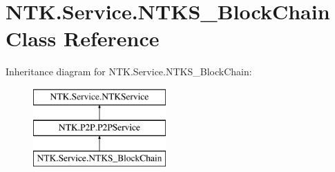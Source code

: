 \hypertarget{class_n_t_k_1_1_service_1_1_n_t_k_s___block_chain}{}\section{N\+T\+K.\+Service.\+N\+T\+K\+S\+\_\+\+Block\+Chain Class Reference}
\label{class_n_t_k_1_1_service_1_1_n_t_k_s___block_chain}


 


Inheritance diagram for N\+T\+K.\+Service.\+N\+T\+K\+S\+\_\+\+Block\+Chain\+:\begin{figure}[H]
\begin{center}
\leavevmode
\includegraphics[height=3.000000cm]{da/dc3/class_n_t_k_1_1_service_1_1_n_t_k_s___block_chain}
\end{center}
\end{figure}

